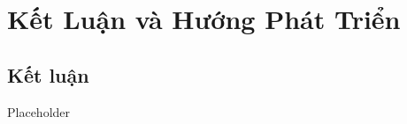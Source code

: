 \def\baselinestretch{1}
\chapter{Kết Luận và Hướng Phát Triển}
\ifpdf
    \graphicspath{{Conclusions/ConclusionsFigs/PNG/}{Conclusions/ConclusionsFigs/PDF/}{Conclusions/ConclusionsFigs/}}
\else
    \graphicspath{{Conclusions/ConclusionsFigs/EPS/}{Conclusions/ConclusionsFigs/}}
\fi

\def\baselinestretch{1.66}

\section{Kết luận}
Placeholder


